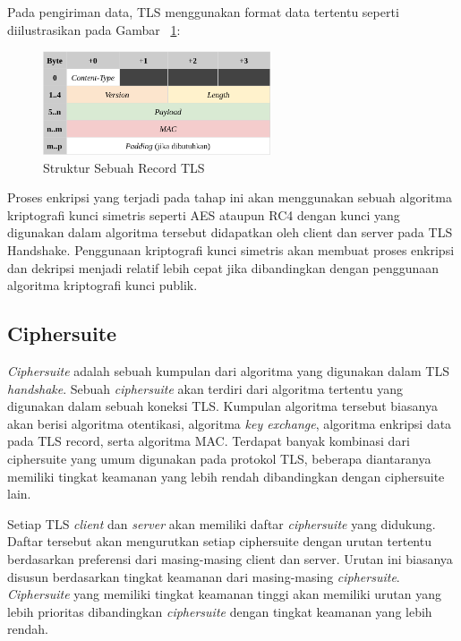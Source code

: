     Pada pengiriman data, TLS menggunakan format data tertentu seperti diilustrasikan pada Gambar ~\ref{fig:tls-record}:
    \begin{figure}[h]
      \centering
      \includegraphics[width=0.6\textwidth]{resources/img/ch-2/tls-record.png}
      \caption{Struktur Sebuah Record TLS \protect\citep{rfc5246}}
      \label{fig:tls-record}
    \end{figure}


    Proses enkripsi yang terjadi pada tahap ini akan menggunakan sebuah algoritma kriptografi kunci simetris seperti AES ataupun RC4 dengan kunci yang digunakan dalam algoritma tersebut didapatkan oleh client dan server pada TLS Handshake. Penggunaan kriptografi kunci simetris akan membuat proses enkripsi dan dekripsi menjadi relatif lebih cepat jika dibandingkan dengan penggunaan algoritma kriptografi kunci publik.


  \subsection{Ciphersuite}
    \textit{Ciphersuite} adalah sebuah kumpulan dari algoritma yang digunakan dalam TLS \textit{handshake}. Sebuah \textit{ciphersuite} akan terdiri dari algoritma tertentu yang digunakan dalam sebuah koneksi TLS. Kumpulan algoritma tersebut biasanya akan berisi algoritma otentikasi, algoritma \textit{key exchange}, algoritma enkripsi data pada TLS record, serta algoritma MAC. Terdapat banyak kombinasi dari ciphersuite yang umum digunakan pada protokol TLS, beberapa diantaranya memiliki tingkat keamanan yang lebih rendah dibandingkan dengan ciphersuite lain.

    Setiap TLS \textit{client} dan \textit{server} akan memiliki daftar \textit{ciphersuite} yang didukung. Daftar tersebut akan mengurutkan setiap ciphersuite dengan urutan tertentu berdasarkan preferensi dari masing-masing client dan server. Urutan ini biasanya disusun berdasarkan tingkat keamanan dari masing-masing \textit{ciphersuite}. \textit{Ciphersuite} yang memiliki tingkat keamanan tinggi akan memiliki urutan yang lebih prioritas dibandingkan \textit{ciphersuite} dengan tingkat keamanan yang lebih rendah.

